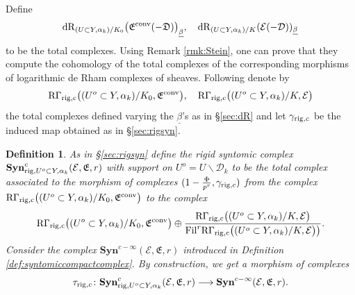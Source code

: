 \documentclass[asterisque,english]{smfart}
\newtheorem{definition}{Definition}[]
\begin{document}
Define
$$\mathrm{dR}_{(U\subset Y,\alpha_k)/K_0}\bigl(\mathfrak{E}^{\rm conv}(-\mathfrak{D})\bigr)_{\underline{\beta}}, \quad \mathrm{dR}_{(U\subset Y,\alpha_k)/K} (\mathcal{E}(-\mathcal{D}))_{\underline{\beta}} $$to be the total complexes. Using Remark \ref{rmk:Stein}, one can prove that they compute the cohomology of the total complexes of the corresponding morphisms of logarithmic de Rham complexes of sheaves.  Following \cite[\S 3 \& \S 4]{Ber} denote by  $$ \mathrm{R\Gamma}_{\rm rig,c}\bigl( (U^o\subset Y,\alpha_k)/K_0,\mathfrak{E}^{\rm conv}\bigr), \quad  \mathrm{R\Gamma}_{\rm rig,c}\bigl( (U^o\subset Y,\alpha_k)/K ,\mathcal{E}\bigr)$$the total complexes defined varying the $\underline{\beta}$'s as in \S \ref{sec:dR} and let $\gamma_{{\rm rig},c}$ be the induced map obtained as in \S \ref{sec:rigsyn}.   


\begin{definition}\label{def:syntomiccompactonU}  As in \S \ref{sec:rigsyn} define the {\em rigid syntomic complex} $\mathbf{Syn}_{{\rm rig},U^o\subset Y, \alpha_k}^c(\mathcal{E},\mathfrak{E},r)$  with support on $U^o=U\backslash \mathcal{D}_k$  to be the total complex associated to the morphism  of complexes $(1-\frac{\Phi}{p^r},\gamma_{{\rm rig},c})$  from the complex $\mathrm{R\Gamma}_{\rm rig,c}\bigl( (U^o\subset Y,\alpha_k)/K_0,\mathfrak{E}^{\rm conv}\bigr)$ to the complex $$ \mathrm{R\Gamma}_{\rm rig,c}\bigl( (U^o\subset Y,\alpha_k)/K_0,\mathfrak{E}^{\rm conv}\bigr) \oplus \frac{\mathrm{R\Gamma}_{\rm rig,c}\bigl( (U^o\subset Y,\alpha_k)/K ,\mathcal{E}\bigr)}{\mathrm{Fil}^r \mathrm{R\Gamma}_{\rm rig,c}\bigl( (U^o\subset Y,\alpha_k)/K ,\mathcal{E}\bigr)\bigr)}.$$
Consider the complex $\mathbf{Syn}^{c-\infty}(\mathcal{E},\mathfrak{E},r)$  introduced in Definition \ref{def:syntomiccompactcomplex}. By construction, we get a morphism of complexes $$\tau_{{\rm rig},c}\colon  \mathbf{Syn}_{{\rm rig},U^o\subset Y, \alpha_k}^c(\mathcal{E},\mathfrak{E},r) \longrightarrow \mathbf{Syn}^{c-\infty}(\mathcal{E},\mathfrak{E},r).$$
\end{definition}
\end{document}
